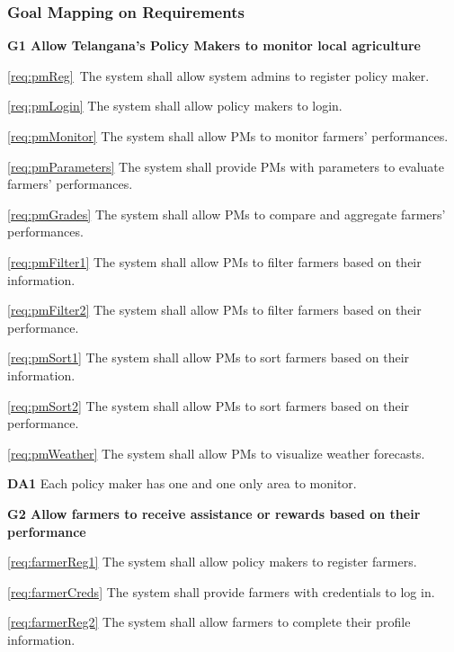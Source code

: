 \documentclass[10pt]{article}
\begin{document}
\subsubsection{Goal Mapping on Requirements}
\begin{description}
    \item \textbf{G1 Allow Telangana's Policy Makers to monitor local agriculture}
        \begin{description}
            \item \ref{req:pmReg}\ The system shall allow system admins to register policy maker.
            \item \ref{req:pmLogin} The system shall allow policy makers to login.
            \item \ref{req:pmMonitor} The system shall allow PMs to monitor farmers' performances.
            \item \ref{req:pmParameters} The system shall provide PMs with parameters to evaluate farmers' performances.
            \item \ref{req:pmGrades} The system shall allow PMs to compare and aggregate farmers' performances.
            \item \ref{req:pmFilter1} The system shall allow PMs to filter farmers based on their information.
            \item \ref{req:pmFilter2} The system shall allow PMs to filter farmers based on their performance.
            \item \ref{req:pmSort1} The system shall allow PMs to sort farmers based on their information.
            \item \ref{req:pmSort2} The system shall allow PMs to sort farmers based on their performance.
            \item \ref{req:pmWeather} The system shall allow PMs to visualize weather forecasts.
            \item \textbf{DA1} Each policy maker has one and one only area to monitor.
        \end{description}
    \item \textbf{G2 Allow farmers to receive assistance or rewards based on their performance}
        \begin{description}
            \item \ref{req:farmerReg1} The system shall allow policy makers to register farmers.    
            \item \ref{req:farmerCreds} The system shall provide farmers with credentials to log in.
            \item \ref{req:farmerReg2} The system shall allow farmers to complete their profile information.

\end{description}
\end{description}
\end{document}
